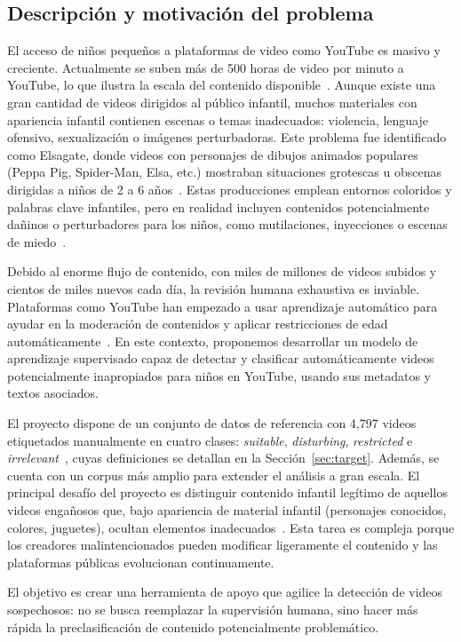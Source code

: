 \documentclass[conference]{IEEEtran}
\begin{document}
\subsection{Descripción y motivación del problema}
El acceso de niños pequeños a plataformas de video como YouTube es masivo y creciente. Actualmente se suben más de 500 horas de video por minuto a YouTube, lo que ilustra la escala del contenido disponible~\cite{brandwatch}. Aunque existe una gran cantidad de videos dirigidos al público infantil, muchos materiales con apariencia infantil contienen escenas o temas inadecuados: violencia, lenguaje ofensivo, sexualización o imágenes perturbadoras. Este problema fue identificado como Elsagate, donde videos con personajes de dibujos animados populares (Peppa Pig, Spider-Man, Elsa, etc.) mostraban situaciones grotescas u obscenas dirigidas a niños de 2 a 6 años~\cite{uscm}. Estas producciones emplean entornos coloridos y palabras clave infantiles, pero en realidad incluyen contenidos potencialmente dañinos o perturbadores para los niños, como mutilaciones, inyecciones o escenas de miedo~\cite{uscm}.

Debido al enorme flujo de contenido, con miles de millones de videos subidos y cientos de miles nuevos cada día, la revisión humana exhaustiva es inviable. Plataformas como YouTube han empezado a usar aprendizaje automático para ayudar en la moderación de contenidos y aplicar restricciones de edad automáticamente~\cite{youtube2020}. En este contexto, proponemos desarrollar un modelo de aprendizaje supervisado capaz de detectar y clasificar automáticamente videos potencialmente inapropiados para niños en YouTube, usando sus metadatos y textos asociados.

El proyecto dispone de un conjunto de datos de referencia con 4,797 videos etiquetados manualmente en cuatro clases: \textit{suitable}, \textit{disturbing}, \textit{restricted} e \textit{irrelevant}~\cite{papadamou}, cuyas definiciones se detallan en la Sección~\ref{sec:target}. Además, se cuenta con un corpus más amplio para extender el análisis a gran escala. El principal desafío del proyecto es distinguir contenido infantil legítimo de aquellos videos engañosos que, bajo apariencia de material infantil (personajes conocidos, colores, juguetes), ocultan elementos inadecuados~\cite{uscm}. Esta tarea es compleja porque los creadores malintencionados pueden modificar ligeramente el contenido y las plataformas públicas evolucionan continuamente.

El objetivo es crear una herramienta de apoyo que agilice la detección de videos sospechosos: no se busca reemplazar la supervisión humana, sino hacer más rápida la preclasificación de contenido potencialmente problemático.
\end{document}
